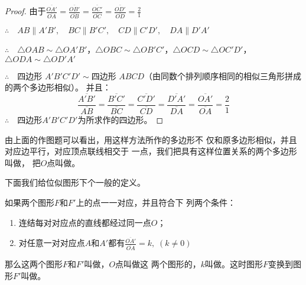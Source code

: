 \begin{figure}
\begin{tikzpicture}
\end{tikzpicture}
    \caption{}
\end{figure}

\begin{proof}
由于$\frac{\overline{OA'}}{\overline{OA}}=\frac{\overline{OB'}}{\overline{OB}}=\frac{\overline{OC'}}{\overline{OC}}=\frac{\overline{OD'}}{\overline{OD}}=\frac{2}{1}$

$\therefore\quad AB\parallel A'B',\quad BC\parallel B'C',\quad 
CD\parallel C'D',\quad DA\parallel D'A'$

$\therefore\quad \triangle OAB\sim \triangle OA'B'$，$ 
\triangle OBC\sim \triangle OB'C'$，$ 
\triangle OCD\sim \triangle OC'D'$，$ 
\triangle ODA\sim \triangle OD'A'$

$\therefore\quad $四边形 $A'B'C'D'\sim $四边形 $ABCD$（由同数个排列顺序相同的相似三角形拼成的两个多边形相似）。
并且：
\[\frac{\overline{A'B'}}{\overline{AB}}=\frac{\overline{B'C'}}{\overline{BC}}=\frac{\overline{C'D'}}{\overline{CD}}=\frac{\overline{D'A'}}{\overline{DA}}=\frac{\overline{OA'}}{\overline{OA}}=\frac{2}{1}\]
$\therefore\quad $四边形$A'B'C'D'$为所求作的四边形。
\end{proof}

由上面的作图题可以看出，用这样方法所作的多边形不
仅和原多边形相似，并且对应边平行，对应顶点联线相交于
一点，我们把具有这样位置关系的两个多边形叫做，
把$O$点叫做。

下面我们给位似图形下个一般的定义。

\begin{Definition} 
如果两个图形$F$和$F'$上的点一一对应，并且符合下
列两个条件：
\begin{enumerate}
    \item 连结每对对应点的直线都经过同一点$O$；
    \item 对任意一对对应点$A$和$A'$都有$\frac{\overline{OA'}}{\overline{OA}}=k,\; (k\ne 0)$
\end{enumerate}
那么这两个图形$F$和$F'$叫做，$O$点叫做这
两个图形的，$k$叫做。这时图形$F$变换到图
形$F'$叫做。
\end{Definition}

